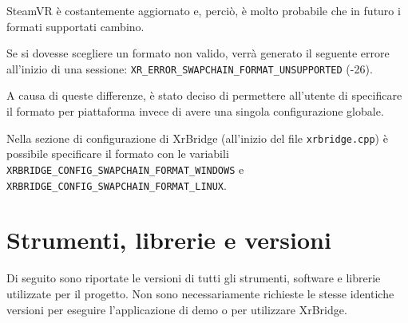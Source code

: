 \documentclass[twoside]{supsistudent}
\begin{document}
SteamVR è costantemente aggiornato e, perciò, è molto probabile che in futuro i formati supportati cambino.

Se si dovesse scegliere un formato non valido, verrà generato il seguente errore all'inizio di una sessione:  \texttt{XR\_ERROR\_SWAPCHAIN\_FORMAT\_UNSUPPORTED} (-26).

A causa di queste differenze, è stato deciso di permettere all'utente di specificare il formato per piattaforma invece di avere una singola configurazione globale.

Nella sezione di configurazione di XrBridge (all'inizio del file \texttt{xrbridge.cpp}) è possibile specificare il formato con le variabili \texttt{XRBRIDGE\_CONFIG\_SWAPCHAIN\_FORMAT\_WINDOWS} e \texttt{XRBRIDGE\_CONFIG\_SWAPCHAIN\_FORMAT\_LINUX}.

\section{Strumenti, librerie e versioni}

Di seguito sono riportate le versioni di tutti gli strumenti, software e librerie utilizzate per il progetto. Non sono necessariamente richieste le stesse identiche versioni per eseguire l'applicazione di demo o per utilizzare XrBridge.
\end{document}
